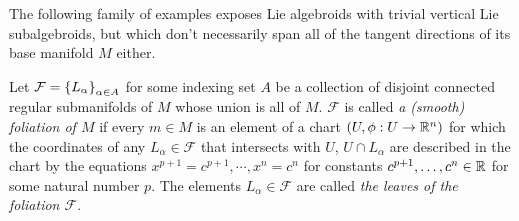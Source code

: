 


The following family of examples exposes Lie algebroids with trivial vertical Lie subalgebroids, but which don't necessarily span all of the tangent directions of its base manifold $M$ either.

\begin{definition}
Let $\mathcal F = \left\{ L_\alpha \right\}_{\alpha \in A}$ for some indexing set $A$ be a collection of disjoint connected regular submanifolds of $M$ whose union is all of $M$. $\mathcal F$ is called \emph{a %
(smooth) foliation of $M$} if every $m \in M$ is an element of a chart $(U, \phi:U \to \RR^n)$ for which the coordinates of any $L_\alpha \in \mathcal F$ that intersects with $U$, $U \cap L_\alpha$ are described in the chart by the equations $x^{p+1} = c^{p+1}, \cdots , x^{n} = c^{n} $ for constants $c^{p+1}, \dots, c^n \in \mathbb{R}$ for some natural number $p$. The elements $L_\alpha \in \mathcal F$ are called \emph{the leaves of the foliation $\mathcal F$}.
\end{definition}

